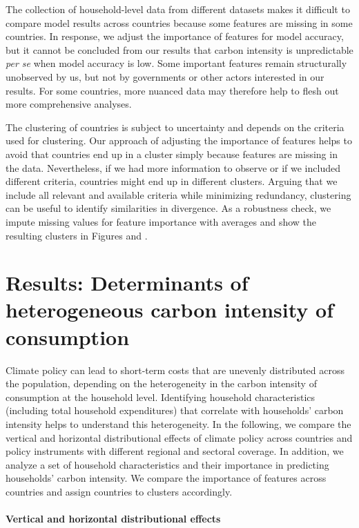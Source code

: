 \documentclass[12pt, a4paper]{article}
\begin{document}
The collection of household-level data from different datasets makes it difficult to compare model results across countries because some features are missing in some countries. In response, we adjust the importance of features for model accuracy, but it cannot be concluded from our results that carbon intensity is unpredictable \textit{per se} when model accuracy is low. Some important features remain structurally unobserved by us, but not by governments or other actors interested in our results. For some countries, more nuanced data may therefore help to flesh out more comprehensive analyses.

The clustering of countries is subject to uncertainty and depends on the criteria used for clustering. Our approach of adjusting the importance of features helps to avoid that countries end up in a cluster simply because features are missing in the data. Nevertheless, if we had more information to observe or if we included different criteria, countries might end up in different clusters. Arguing that we include all relevant and available criteria while minimizing redundancy, clustering can be useful to identify similarities in divergence. As a robustness check, we impute missing values for feature importance with averages and show the resulting clusters in Figures  and .

\section{Results: Determinants of heterogeneous carbon intensity of consumption} \label{sec:results}

Climate policy can lead to short-term costs that are unevenly distributed across the population, depending on the heterogeneity in the carbon intensity of consumption at the household level. Identifying household characteristics (including total household expenditures) that correlate with households' carbon intensity helps to understand this heterogeneity. In the following, we compare the vertical and horizontal distributional effects of climate policy across countries and policy instruments with different regional and sectoral coverage. In addition, we analyze a set of household characteristics and their importance in predicting households' carbon intensity. We compare the importance of features across countries and assign countries to clusters accordingly.

\paragraph{Vertical and horizontal distributional effects}
\end{document}
